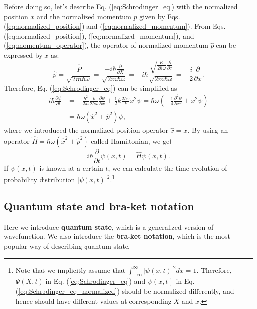 \documentclass{book}
\begin{document}
Before doing so, let's describe Eq. (\ref{eq:Schrodinger_eq}) with the normalized position $x$ and the normalized momentum $p$ given by Eqs. (\ref{eq:normalized_position}) and (\ref{eq:normalized_momentum}). From Eqs. (\ref{eq:normalized_position}), (\ref{eq:normalized_momentum}), and (\ref{eq:momentum_operator}), the operator of normalized momentum $\hat p$ can be expressed by $x$ as:
\begin{equation}
  \hat p = \frac{\hat P}{\sqrt{2m\hbar \omega}} = \frac{-i\hbar \frac{\partial}{\partial X}}{\sqrt{2m\hbar \omega}}
  =-i\hbar \frac{\sqrt{\frac{K}{2\hbar\omega}}\frac{\partial}{\partial x}}{\sqrt{2m\hbar \omega}} = -\frac{i}{2}\frac{\partial}{\partial x}.
\end{equation}
Therefore, Eq. (\ref{eq:Schrodinger_eq}) can be simplified as
\begin{equation}
\begin{aligned}
  i\hbar \frac{\partial \psi}{\partial t} &= -\frac{\hbar^2}{2m}\frac{k}{2\hbar \omega}\frac{\partial \psi}{\partial x} + \frac 1 2 k \frac{2\hbar \omega}{k}x^2 \psi = \hbar \omega \left( -\frac 1 4 \frac{\partial^2\psi}{\partial x^2} + x^2 \psi\right)\\
  &= \hbar \omega (\hat x^2 + \hat p^2)\psi,
  \label{eq:Schrodinger_eq_normalized}
\end{aligned}
\end{equation}
where we introduced the normalized position operator $\hat x = x$. By using an operator $\hat H = \hbar \omega (\hat x^2 + \hat p^2)$ called Hamiltonian, we get
\begin{equation}
  i\hbar \frac{\partial}{\partial t}\psi(x,t) = \hat H\psi(x,t).
\end{equation}
If $\psi(x,t)$ is known at a certain $t$, we can calculate the time evolution of probability distribution $|\psi(x,t)|^2$.\footnote{Note that we implicitly assume that $\int_{-\infty}^{\infty}|\psi(x,t)|^2dx = 1$. Therefore, $\Psi(X, t)$ in Eq. (\ref{eq:Schrodinger_eq}) and $\psi(x,t)$ in Eq. (\ref{eq:Schrodinger_eq_normalized}) should be normalized differently, and hence should have different values at corresponding $X$ and $x$.}

\subsection{Quantum state and bra-ket notation}

Here we introduce \textbf{quantum state}, which is a generalized version of wavefunction. We also introduce the \textbf{bra-ket notation}, which is the most popular way of describing quantum state. 
\end{document}
